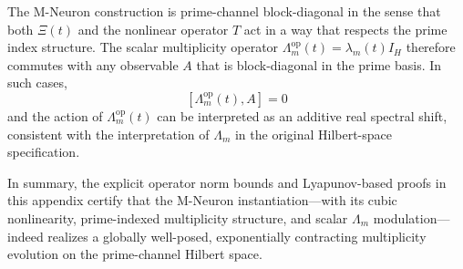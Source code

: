 \documentclass[11pt]{article}
\begin{document}
The M-Neuron construction is prime-channel block-diagonal in the sense that both \(\Xi(t)\) and the nonlinear operator \(T\) act in a way that respects the prime index structure.
The scalar multiplicity operator \(\Lambda_m^{\mathrm{op}}(t) = \lambda_m(t)I_H\) therefore commutes with any observable \(A\) that is block-diagonal in the prime basis.
In such cases,
\[
[\Lambda_m^{\mathrm{op}}(t), A] = 0
\]
and the action of \(\Lambda_m^{\mathrm{op}}(t)\) can be interpreted as an additive real spectral shift, consistent with the interpretation of \(\Lambda_m\) in the original Hilbert-space specification.

In summary, the explicit operator norm bounds and Lyapunov-based proofs in this appendix certify that the M-Neuron instantiation—with its cubic nonlinearity, prime-indexed multiplicity structure, and scalar \(\Lambda_m\) modulation—indeed realizes a globally well-posed, exponentially contracting multiplicity evolution on the prime-channel Hilbert space.

\nocite{*}
  
  
\end{document}

